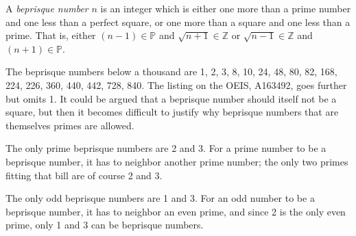 \documentclass[12pt]{article}
\begin{document}
A {\em beprisque number} $n$ is an integer which is either one more than a prime number and one less than a perfect square, or one more than a square and one less than a prime. That is, either $(n - 1) \in \mathbb{P}$ and $\sqrt{n + 1} \in \mathbb{Z}$ or $\sqrt{n - 1} \in \mathbb{Z}$ and $(n + 1) \in \mathbb{P}$.

The beprisque numbers below a thousand are 1, 2, 3, 8, 10, 24, 48, 80, 82, 168, 224, 226, 360, 440, 442, 728, 840. The listing on the OEIS, A163492, goes further but omits 1. It could be argued that a beprisque number should itself not be a square, but then it becomes difficult to justify why beprisque numbers that are themselves primes are allowed.

The only prime beprisque numbers are 2 and 3. For a prime number to be a beprisque number, it has to neighbor another prime number; the only two primes fitting that bill are of course 2 and 3.

The only odd beprisque numbers are 1 and 3. For an odd number to be a beprisque number, it has to neighbor an even prime, and since 2 is the only even prime, only 1 and 3 can be beprisque numbers.
\end{document}
